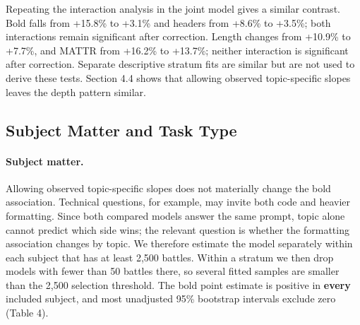 \documentclass[
]{article}
\begin{document}
Repeating the interaction analysis in the joint model gives a similar
contrast. Bold falls from +15.8\% to +3.1\% and headers from +8.6\% to
+3.5\%; both interactions remain significant after correction. Length
changes from +10.9\% to +7.7\%, and MATTR from +16.2\% to +13.7\%;
neither interaction is significant after correction. Separate
descriptive stratum fits are similar but are not used to derive these
tests. Section 4.4 shows that allowing observed topic-specific slopes
leaves the depth pattern similar.

\subsection{Subject Matter and Task
Type}\label{does-subject-matter-explain-the-formatting-association}

\paragraph{Subject matter.}

Allowing observed topic-specific slopes does not materially change the
bold association. Technical questions, for example, may invite both code
and heavier formatting. Since both compared models answer the same
prompt, topic alone cannot predict which side wins; the relevant question
is whether the formatting association
changes by topic. We therefore estimate the model separately within each
subject that has at least 2,500 battles. Within a stratum we then drop
models with fewer than 50 battles there, so several fitted samples are
smaller than the 2,500 selection threshold. The bold point estimate is positive
in \textbf{every} included subject, and most unadjusted 95\% bootstrap
intervals exclude zero (Table 4).
\end{document}
